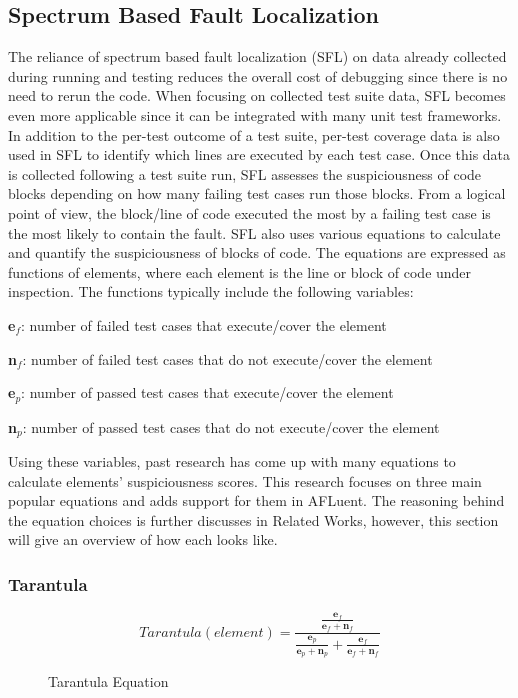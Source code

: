 \subsection{Spectrum Based Fault Localization}
\label{subsec:SpectrumBased}

The reliance of spectrum based fault localization (SFL) on data already
collected during running and testing reduces the overall cost of debugging since
there is no need to rerun the code. When focusing on collected test suite data,
SFL becomes even more applicable since it can be integrated with many unit test
frameworks. In addition to the per-test outcome of a test suite, per-test
coverage data is also used in SFL to identify which lines are executed by each
test case. Once this data is collected following a test suite run, SFL assesses
the suspiciousness of code blocks depending on how many failing test cases run
those blocks. From a logical point of view, the block/line of code executed the
most by a failing test case is the most likely to contain the fault. SFL also
uses various equations to calculate and quantify the
suspiciousness of blocks of code. The equations are expressed as functions of
elements, where each element is the line or block of code under inspection. The
functions typically include the following variables\cite{Wong2014DStar}:

\begin{center}
	\textbf{e$_{f}$}: number of failed test cases that execute/cover the element

	\textbf{n$_{f}$}: number of failed test cases that do not execute/cover the element

	\textbf{e$_{p}$}: number of passed test cases that execute/cover the element

	\textbf{n$_{p}$}: number of passed test cases that do not execute/cover the element
\end{center}

Using these variables, past research has come up with many equations to
calculate elements' suspiciousness scores. This research focuses on three main
popular equations and adds support for them in AFLuent. The reasoning behind the
equation choices is further discusses in Related Works, however, this section
will give an overview of how each looks like.

\subsubsection{Tarantula}
\label{subsubsec:Tarantula}
\begin{figure}[!htb]
	\begin{center}
		\begin{equation}
			Tarantula(element) = \frac{\frac{\textbf{e$_{f}$}}{\textbf{e$_{f}$} + \textbf{n$_{f}$}}}{\frac{\textbf{e$_{p}$}}{\textbf{e$_{p}$}+\textbf{n$_{p}$}} + \frac{\textbf{e$_{f}$}}{\textbf{e$_{f}$}+\textbf{n$_{f}$}}}
		\end{equation}
		\caption{\label{fig:tarantulaEquation} Tarantula Equation\cite{Jones2005TarantulaEval}}
	\end{center}
\end{figure}

